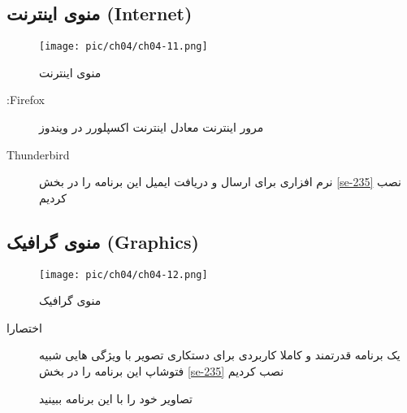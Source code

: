 \subsection{منوی اینترنت (Internet)}\label{se-384}
\begin{figure}[H]%
	\caption{منوی اینترنت}
	\begin{center}
		\texttt{[image: pic/ch04/ch04-11.png]}
	\end{center}
	\label{pic-33}
\end{figure}
\begin{description}
	\item[:Firefox] مرور اینترنت معادل اینترنت اکسپلورر در ویندوز
	\item[Thunderbird] نرم افزاری برای ارسال و دریافت ایمیل این برنامه را در بخش
\ref{se-235}
نصب کردیم
\end{description}
\subsection{منوی گرافیک (Graphics)}\label{se-385}
\begin{figure}[H]%
	\caption{منوی گرافیک}
	\begin{center}
		\texttt{[image: pic/ch04/ch04-12.png]}
	\end{center}
	\label{pic-34}
\end{figure}
\begin{description}
	\item[ اختصارا ] 
	یک برنامه قدرتمند و کاملا کاربردی برای دستکاری تصویر با ویژگی هایی شبیه فتوشاپ این برنامه را در بخش
\ref{se-235}
نصب کردیم
\item[] تصاویر خود را با این برنامه ببینید
\end{description}
